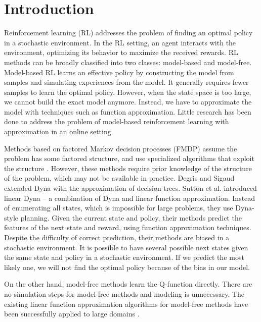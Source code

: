 
\chapter{Introduction}
\label{ch:intro}

Reinforcement learning (RL) addresses the problem of finding an optimal policy in a stochastic environment.
In the RL setting, an agent interacts with the environment, optimizing its behavior to
maximize the received rewards.
RL methods can be broadly classified into two classes: model-based and
model-free.  Model-based RL learns an effective policy by
constructing the model from samples and simulating experiences from the model. It
generally requires fewer samples to learn the optimal policy. However, when the
state space is too large, we cannot build the exact model anymore. Instead, we
have to approximate the model with techniques such as function approximation. Little 
research has been done to address the problem of model-based reinforcement learning with approximation in
an online setting.

Methods based on factored Markov decision processes (FMDP) assume the problem has some factored structure, and use 
specialized algorithms that exploit the structure \cite{ApproxFactor} \cite{SPUDD}. 
However, these methods require prior knowledge
of the structure of the problem, which may not be available in practice.
Degris and Sigaud \cite{ApproxTree} extended Dyna \cite{Dyna} with the approximation of decision trees.
Sutton et al. \cite{ApproxDyna} introduced linear Dyna -- a combination 
of Dyna and linear function approximation. 
Instead of enumerating all states, which is impossible for large problems, they
use Dyna-style planning. Given the current state and policy, 
their methods predict the features of the next state and reward, using function approximation
techniques. Despite the difficulty of correct prediction, their methods are biased 
in a stochastic environment. It is possible to have
several possible next states given the same state and policy in a stochastic environment.
If we predict the most likely one, we will not find the optimal policy because of the bias in our model.

On the other hand, model-free methods learn the Q-function directly. 
There are no simulation steps for model-free methods and modeling is unnecessary. 
The existing linear function approximation algorithms for model-free methods have been successfully 
applied to large domains \cite{LSTD99}\cite{KeepAway}. 

